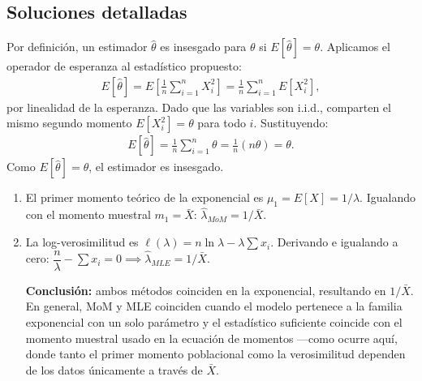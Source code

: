\subsection*{Soluciones detalladas}

\begin{solproblema}[prob:1d85679]
	Por definición, un estimador $\hat{\theta}$ es insesgado para $\theta$ si $E[\hat{\theta}] = \theta$. Aplicamos el operador de esperanza al estadístico propuesto:
	\begin{align}
		E[\hat{\theta}] = E\left[ \frac{1}{n} \sum_{i=1}^n X_i^2 \right] = \frac{1}{n} \sum_{i=1}^n E\left[ X_i^2 \right],
	\end{align}
	por linealidad de la esperanza. Dado que las variables son i.i.d., comparten el mismo segundo momento $E[X_i^2] = \theta$ para todo $i$. Sustituyendo:
	\begin{align}
		E[\hat{\theta}] = \frac{1}{n} \sum_{i=1}^n \theta = \frac{1}{n} (n \theta) = \theta.
	\end{align}
	Como $E[\hat{\theta}] = \theta$, el estimador es insesgado.
\end{solproblema}

\begin{solproblema}[prob:6f639cf]
	\begin{enumerate}
		\item El primer momento teórico de la exponencial es $\mu_1 = E[X] = 1/\lambda$. Igualando con el momento muestral $m_1=\bar{X}$: $\hat{\lambda}_{MoM} = 1/\bar{X}$.
		\item La log-verosimilitud es $\ell(\lambda) = n\ln\lambda - \lambda\sum x_i$. Derivando e igualando a cero: $\dfrac{n}{\lambda}-\sum x_i=0 \implies \hat{\lambda}_{MLE}=1/\bar{X}$.

		\textbf{Conclusión:} ambos métodos coinciden en la exponencial, resultando en $1/\bar{X}$. En general, MoM y MLE coinciden cuando el modelo pertenece a la familia exponencial con un solo parámetro y el estadístico suficiente coincide con el momento muestral usado en la ecuación de momentos —como ocurre aquí, donde tanto el primer momento poblacional como la verosimilitud dependen de los datos únicamente a través de $\bar{X}$.
	\end{enumerate}
\end{solproblema}

